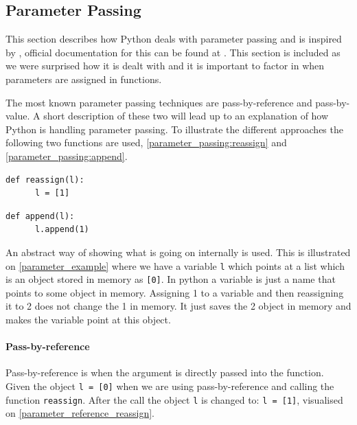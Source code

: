 \subsection{Parameter Passing}
This section describes how Python deals with parameter passing and is inspired by \citet{parameter_passing}, official documentation for this can be found at \citet{parameter_passing_official}.
This section is included as we were surprised how it is dealt with and it is important to factor in when parameters are assigned in functions.

The most known parameter passing techniques are pass-by-reference and pass-by-value.
A short description of these two will lead up to an explanation of how Python is handling parameter passing.
To illustrate the different approaches the following two functions are used, \cref{parameter_passing:reassign} and \cref{parameter_passing:append}.

\begin{lstlisting}[style=python, caption={Parameter passing: \texttt{reassign} function.}, label={parameter_passing:reassign}]
  def reassign(l):
      l = [1]
\end{lstlisting}

\begin{lstlisting}[style=python, caption={Parameter passing: \texttt{append} function.}, label={parameter_passing:append}]
  def append(l):
      l.append(1)
\end{lstlisting}

An abstract way of showing what is going on internally is used.
This is illustrated on \cref{parameter_example} where we have a variable \texttt{l} which points at a list which is an object stored in memory as \texttt{[0]}.
In python a variable is just a name that points to some object in memory.
Assigning 1 to a variable and then reassigning it to 2 does not change the 1 in memory.
It just saves the 2 object in memory and makes the variable point at this object.


\paragraph{Pass-by-reference}
Pass-by-reference is when the argument is directly passed into the function.
Given the object \texttt{l = [0]} when we are using pass-by-reference and calling the function \texttt{reassign}.
After the call the object \texttt{l} is changed to: \texttt{l = [1]}, visualised on \cref{parameter_reference_reassign}.

